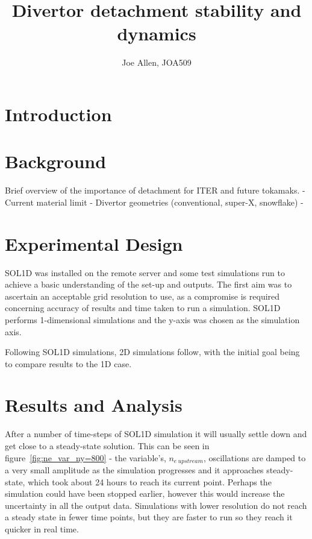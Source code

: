 \documentclass[11pt, twocolumn]{article}  %
\providecommand{\neupstream}{$n_{e~upstream}$} %
\begin{document}
\title{Divertor detachment stability and dynamics}
\author{Joe Allen, JOA509}



\section{Introduction}\label{sec:Intro}

\section{Background}\label{sec:Bg}
Brief overview of the importance of detachment for ITER and future tokamaks.
- Current material limit
- Divertor geometries (conventional, super-X, snowflake)
- 


\section{Experimental Design}\label{sec:Expt}
SOL1D was installed on the remote server and some test simulations run to achieve a basic understanding of the set-up and outputs. The first aim was to ascertain an acceptable grid resolution to use, as a compromise is required concerning accuracy of results and time taken to run a simulation. SOL1D performs 1-dimensional simulations and the y-axis was chosen as the simulation axis. 

Following SOL1D simulations, 2D simulations follow, with the initial goal being to compare results to the 1D case.

\section{Results and Analysis}\label{sec:Results}
After a number of time-steps of SOL1D simulation it will usually settle down and get close to a steady-state solution. This can be seen in figure~\ref{fig:ne_var_ny=800} - the variable's, \neupstream, oscillations are damped to a very small amplitude as the simulation progresses and it approaches steady-state, which took about 24 hours to reach its current point. Perhaps the simulation could have been stopped earlier, however this would increase the uncertainty in all the output data. Simulations with lower resolution do not reach a steady state in fewer time points, but they are faster to run so they reach it quicker in real time.
\end{document}
